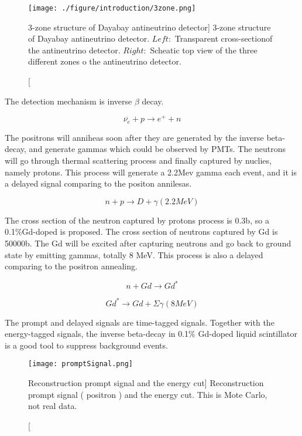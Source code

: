\begin{figure}
    \centering
    \texttt{[image: ./figure/introduction/3zone.png]}
    \caption
    [3-zone structure of Dayabay antineutrino detector]
    {3-zone structure of Dayabay antineutrino detector. $Left:$ Transparent cross-sectionof the antineutrino detector.
$Right:$ Scheatic top view of the three different zones o the antineutrino detector.}
    \label{fig:3zone.png}
    \end{figure}


The detection mechanism is inverse $\beta$ decay.


\begin{equation}
\overline{\nu_e} + p \rightarrow e^+ + n
\label{InverseBetaDecay}
\end{equation}


The positrons will anniheas soon after they are generated by the inverse beta-decay,
and generate gammas which could be observed by PMTs. The neutrons will go through
thermal scattering process and finally captured by nuclies, namely protons. This
process will generate a 2.2Mev gamma each event, and it is a delayed signal comparing
to the positon annilesas.


\begin{equation}
n + p \rightarrow D + \gamma (2.2 MeV)
\label{NeutronPCapture}
\end{equation}


The cross section of the neutron captured by protons process is 0.3b, so a 0.1\%Gd-doped
is proposed. The cross section of neutrons captured by Gd is 50000b. The Gd will be excited
after capturing neutrons and go back to ground state by emitting gammas, totally 8 MeV. This
process is also a delayed comparing to the positron annealing.


\begin{equation}
n + Gd \rightarrow Gd^*
\label{NeutronGdCapture}
\end{equation}


\begin{equation}
Gd^* \rightarrow Gd + \Sigma \gamma (8 MeV)
\label{GdStarToGd}
\end{equation}


The prompt and delayed signals are time-tagged signals.
Together with the energy-tagged signals, the inverse beta-decay
in 0.1\% Gd-doped liquid scintillator is a good tool to suppress
background events.


\begin{figure}
    \label{fig:promptSignal}
    \centering
    \texttt{[image: promptSignal.png]}
    \caption
    [Reconstruction prompt signal and the energy cut]
    {Reconstruction prompt signal ( positron ) and the energy cut. This is Mote Carlo, not real data.}
    \end{figure}

